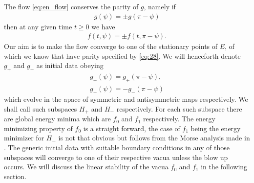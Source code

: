 The flow \eqref{eq:en_flow} conserves the parity of $g$, namely if
\begin{align}
  \label{eq:36}
  g(\psi)=\pm g(\pi-\psi)
\end{align}
then at any given time $t\ge0$ we have
\begin{align}\label{eq:37}
  f(t,\psi)=\pm f(t,\pi-\psi).
\end{align}
Our aim is to make the flow converge to one of the stationary points
of $E$, of which we know that have parity specified by
\eqref{eq:28}. We will henceforth denote $g_+$ and $g_-$ as initial
data obeying
\begin{align}
  \label{eq:38}
  g_+(\psi)=g_+(\pi-\psi),\\
  g_-(\psi)=-g_-(\pi-\psi)
\end{align}
which evolve in the apace of symmetric and antisymmetric maps
respectively. We shall call such subspaces $H_+$ and $H_-$
respectively. For each such subspace there are global energy minima
which are $f_0$ and $f_1$ respectively. The energy minimizing property
of $f_0$ is a straight forward, the case of $f_1$ being the energy
minimizer for $H_-$ is not that obvious but follows from the Morse
analysis made in \cite{Corlette2001}. The generic initial data with
suitable boundary conditions in any of those subspaces will converge
to one of their respective vacua unless the blow up occurs. We will
discuss the linear stability of the vacua $f_0$ and $f_1$ in the
following section.

